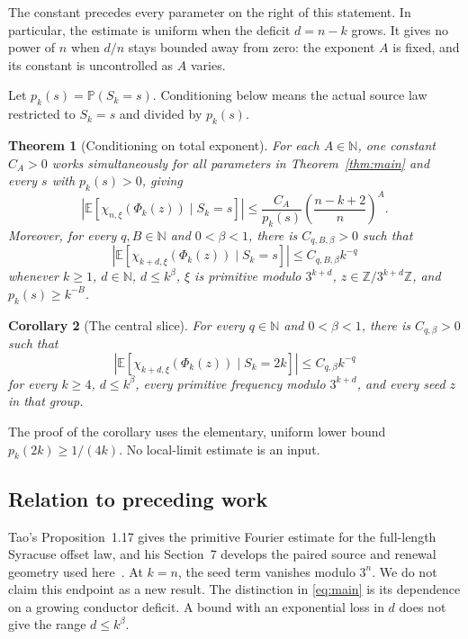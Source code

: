 \documentclass[11pt,a4paper]{article}
\newtheorem{theorem}{Theorem}
\newtheorem{corollary}[theorem]{Corollary}
\newcommand{\N}{\mathbb N}
\newcommand{\Z}{\mathbb Z}
\newcommand{\E}{\mathbb E}
\newcommand{\PP}{\mathbb P}
\newcommand{\abs}[1]{\left|#1\right|}
\begin{document}
The constant precedes every parameter on the right of this statement.
In particular, the estimate is uniform when the deficit \(d=n-k\)
grows. It gives no power of \(n\) when \(d/n\) stays bounded away from
zero: the exponent \(A\) is fixed, and its constant is uncontrolled as
\(A\) varies.

Let \(p_k(s)=\PP(S_k=s)\). Conditioning below means the actual source
law restricted to \(S_k=s\) and divided by \(p_k(s)\).

\begin{theorem}[Conditioning on total exponent]\label{thm:conditional}
For each \(A\in\N\), one constant \(C_A>0\) works simultaneously for
all parameters in Theorem~\ref{thm:main} and every \(s\) with
\(p_k(s)>0\), giving
\begin{equation}\label{eq:conditional}
 \abs{\E[\chi_{n,\xi}(\Phi_k(z))\mid S_k=s]}
 \le \frac{C_A}{p_k(s)}\left(\frac{n-k+2}{n}\right)^A.
\end{equation}
Moreover, for every \(q,B\in\N\) and \(0<\beta<1\), there is
\(C_{q,B,\beta}>0\) such that
\begin{equation}\label{eq:massfloor}
 \abs{\E[\chi_{k+d,\xi}(\Phi_k(z))\mid S_k=s]}
 \le C_{q,B,\beta}k^{-q}
\end{equation}
whenever \(k\ge1\), \(d\in\N\), \(d\le k^\beta\), \(\xi\) is
primitive modulo \(3^{k+d}\), \(z\in\Z/3^{k+d}\Z\), and
\(p_k(s)\ge k^{-B}\).
\end{theorem}

\begin{corollary}[The central slice]\label{cor:central}
For every \(q\in\N\) and \(0<\beta<1\), there is \(C_{q,\beta}>0\)
such that
\[
 \abs{\E[\chi_{k+d,\xi}(\Phi_k(z))\mid S_k=2k]}
 \le C_{q,\beta}k^{-q}
\]
for every \(k\ge4\), \(d\le k^\beta\), every primitive frequency
modulo \(3^{k+d}\), and every seed \(z\) in that group.
\end{corollary}

The proof of the corollary uses the elementary, uniform lower bound
\(p_k(2k)\ge1/(4k)\). No local-limit estimate is an input.

\subsection{Relation to preceding work}

Tao's Proposition~1.17 gives the primitive Fourier estimate for the
full-length Syracuse offset law, and his Section~7 develops the paired
source and renewal geometry used here~\cite{Tao}.
At \(k=n\), the seed term vanishes modulo \(3^n\).
We do not claim this endpoint as a new result.
The distinction in \eqref{eq:main} is its dependence on a growing
conductor deficit. A bound with an exponential loss in \(d\) does not
give the range \(d\le k^\beta\).
\end{document}

